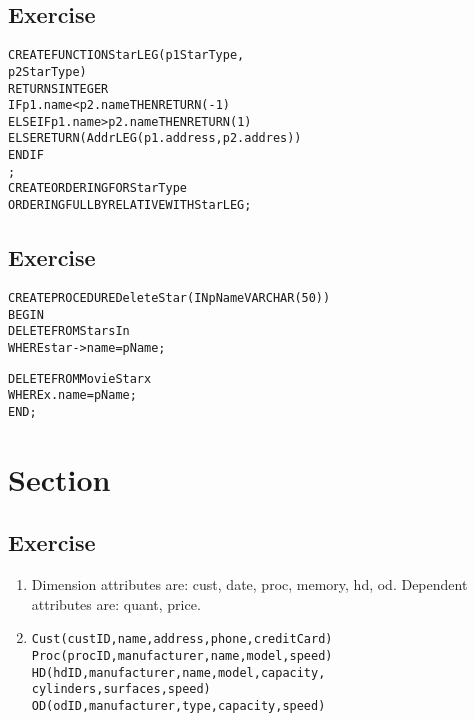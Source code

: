 \setcounter{subsection}{4}
\subsection*{Exercise \thesubsection}
\begin{alltt}
CREATE FUNCTION StarLEG(p1 StarType,
                        p2 StarType )
RETURNS INTEGER
  IF     p1.name < p2.name THEN RETURN(-1)
  ELSEIF p1.name > p2.name THEN RETURN( 1)
  ELSE   RETURN(AddrLEG(p1.address,p2.addres))
  ENDIF
;
CREATE ORDERING FOR StarType
  ORDERING FULL BY RELATIVE WITH StarLEG;
\end{alltt}


\setcounter{subsection}{5}
\subsection*{Exercise \thesubsection}
\begin{alltt}
CREATE PROCEDURE DeleteStar(IN pName VARCHAR(50))
BEGIN
  DELETE FROM StarsIn
  WHERE  star->name = pName;

  DELETE FROM MovieStar x
  WHERE  x.name = pName;
END;
\end{alltt}


\setcounter{section}{6}
\section*{Section \thesection}

\setcounter{subsection}{1}
\subsection*{Exercise \thesubsection}
\begin{enumerate}
\item
Dimension attributes are: cust, date, proc, memory, hd, od. \newline
Dependent attributes are: quant, price.\newline
\item
\begin{alltt}
Cust(custID, name, address, phone, creditCard)
Proc(procID, manufacturer, name, model, speed)
HD(hdID, manufacturer, name, model, capacity,
   cylinders, surfaces, speed)
OD(odID, manufacturer, type, capacity, speed)
\end{alltt}
\end{enumerate}

